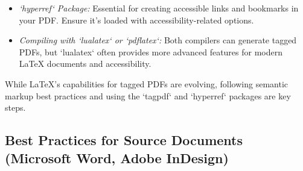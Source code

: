 \begin{itemize}
\begin{itemize}
\item \emph{`hyperref` Package:} Essential for creating accessible links and bookmarks in your PDF. Ensure it's loaded with accessibility-related options.
\item \emph{Compiling with `lualatex` or `pdflatex`:} Both compilers can generate tagged PDFs, but `lualatex` often provides more advanced features for modern LaTeX documents and accessibility.
\end{itemize}
While LaTeX's capabilities for tagged PDFs are evolving, following semantic markup best practices and using the `tagpdf` and `hyperref` packages are key steps.

\subsection{Best Practices for Source Documents (Microsoft Word, Adobe InDesign)}
\label{subsec:best-practices-source}

\end{itemize}
